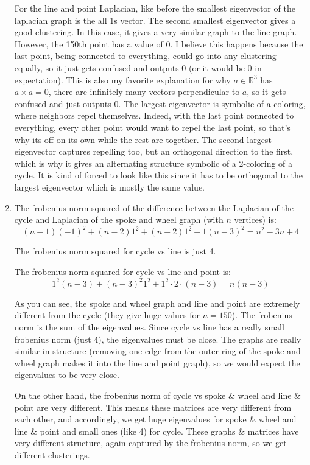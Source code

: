 \documentclass[12pt]{article}
\def\mbb#1{\mathbb{#1}}
\def \R{\mbb{R}}
\begin{document}
\begin{enumerate}[leftmargin=\labelsep, label=(\alph*)]
        For the line and point Laplacian, like before the smallest eigenvector of the laplacian graph is the all 1s vector. The second smallest eigenvector gives a good clustering. In this case, it gives a very similar graph to the line graph. However, the 150th point has a value of 0. I believe this happens because the last point, being connected to everything, could go into any clustering equally, so it just gets confused and outputs 0 (or it would be 0 in expectation). This is also my favorite explanation for why $a \in \R^3$ has $a \times a = 0$, there are infinitely many vectors perpendicular to $a$, so it gets confused and just outputs 0. The largest eigenvector is symbolic of a coloring, where neighbors repel themselves. Indeed, with the last point connected to everything, every other point would want to repel the last point, so that's why its off on its own while the rest are together. The second largest eigenvector captures repelling too, but an orthogonal direction to the first, which is why it gives an alternating structure symbolic of a 2-coloring of a cycle. It is kind of forced to look like this since it has to be orthogonal to the largest eigenvector which is mostly the same value.

        \item The frobenius norm squared of the difference between the Laplacian of the cycle and Laplacian of the spoke and wheel graph (with $n$ vertices) is:
        $$(n-1)(-1)^2 + (n-2) 1^2 + (n-2) 1^2 + 1(n-3)^2 = n^2-3n+4$$
        
        The frobenius norm squared for cycle vs line is just 4.
        
        The frobenius norm squared for cycle vs line and point is:
        $$1^2(n-3) + (n-3)^2 1^2 + 1^2 \cdot 2 \cdot (n-3) = n(n-3)$$
        
        As you can see, the spoke and wheel graph and line and point are extremely different from the cycle (they give huge values for $n=150$). The frobenius norm is the sum of the eigenvalues. Since cycle vs line has a really small frobenius norm (just 4), the eigenvalues must be close. The graphs are really similar in structure (removing one edge from the outer ring of the spoke and wheel graph makes it into the line and point graph), so we would expect the eigenvalues to be very close.
        
        On the other hand, the frobenius norm of cycle vs spoke \& wheel and line \& point are very different. This means these matrices are very different from each other, and accordingly, we get huge eigenvalues for spoke \& wheel and line \& point and small ones (like 4) for cycle. These graphs \& matrices have very different structure, again captured by the frobenius norm, so we get different clusterings.


\end{enumerate}
\end{document}
